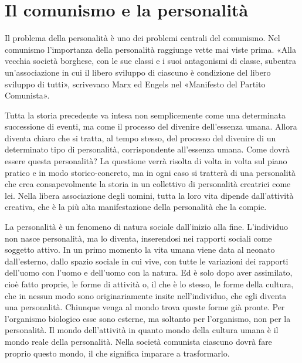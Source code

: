 \documentclass[../main]{subfiles}
\begin{document}
\ifSubfilesClassLoaded{\setcounter{page}{47}}{}
\section{Il comunismo e la personalità}
\label{sec:08_comunismo_individuo}

Il problema della personalità è uno dei problemi centrali del comunismo. Nel comunismo l'importanza della personalità raggiunge vette mai viste prima. «Alla vecchia società borghese, con le sue classi e i suoi antagonismi di classe, subentra un'associazione in cui il libero sviluppo di ciascuno è condizione del libero sviluppo di tutti», scrivevano Marx ed Engels nel «Manifesto del Partito Comunista».

Tutta la storia precedente va intesa non semplicemente come una determinata successione di eventi, ma come il processo del divenire dell'essenza umana. Allora diventa chiaro che si tratta, al tempo stesso, del processo del divenire di un determinato tipo di personalità, corrispondente all'essenza umana. Come dovrà essere questa personalità? La questione verrà risolta di volta in volta sul piano pratico e in modo storico-concreto, ma in ogni caso si tratterà di una personalità che crea consapevolmente la storia in un collettivo di personalità creatrici come lei. Nella libera associazione degli uomini, tutta la loro vita dipende dall'attività creativa, che è la più alta manifestazione della personalità che la compie.

La personalità è un fenomeno di natura sociale dall'inizio alla fine. L'individuo non nasce personalità, ma lo diventa, inserendosi nei rapporti sociali come soggetto attivo. In un primo momento la vita umana viene data al neonato dall'esterno, dallo spazio sociale in cui vive, con tutte le variazioni dei rapporti dell'uomo con l'uomo e dell'uomo con la natura. Ed è solo dopo aver assimilato, cioè fatto proprie, le forme di attività o, il che è lo stesso, le forme della cultura, che in nessun modo sono originariamente insite nell'individuo, che egli diventa una personalità. Chiunque venga al mondo trova queste forme già pronte. Per l'organismo biologico esse sono esterne, ma soltanto per l'organismo, non per la personalità. Il mondo dell'attività in quanto mondo della cultura umana è il mondo reale della personalità. Nella società comunista ciascuno dovrà fare proprio questo mondo, il che significa imparare a trasformarlo.
\end{document}
